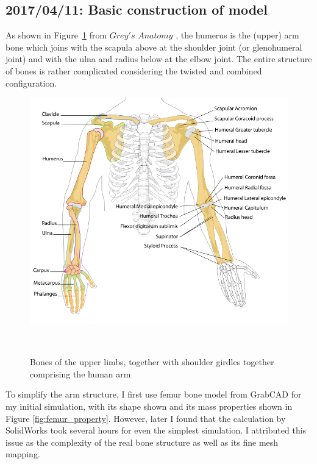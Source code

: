 \documentclass{sigchi}
\begin{document}
\subsection{2017/04/11: Basic construction of model}

As shown in Figure~\ref{fig:arm_diagram} from $Grey's$ $Anatomy$ \cite{WikipediaEN:Arm}, the humerus is the (upper) arm bone which joins with the scapula above at the shoulder joint (or glenohumeral joint) and with the ulna and radius below at the elbow joint. The entire structure of bones is rather complicated considering the twisted and combined configuration.


\begin{figure}
\centering
  \includegraphics[width=0.9\columnwidth]{figures/human_arm_bones_diagram}
  \caption{Bones of the upper limbs, together with shoulder girdles together comprising the human arm}~\label{fig:arm_diagram}
\end{figure}


To simplify the arm structure, I first use femur bone model from GrabCAD \cite{SB:bone} for my initial simulation, with its shape shown and its mass properties shown in Figure \ref{fig:femur_property}. However, later I found that the calculation by SolidWorks took several hours for even the simplest simulation. I attributed this issue as the complexity of the real bone structure as well as its fine mesh mapping. 
\end{document}

